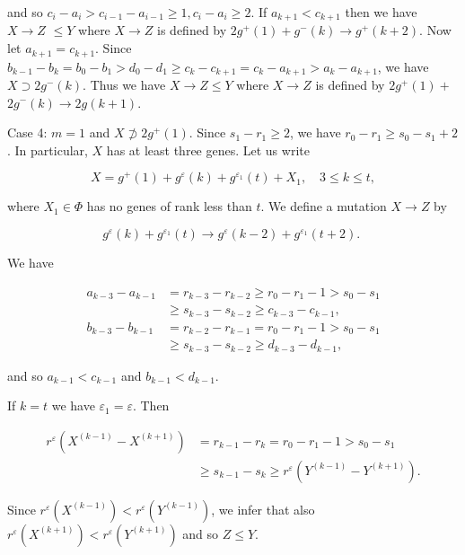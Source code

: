 \documentclass[10pt]{article}
\begin{document}
and so $c_{i}-a_{i}>c_{i-1}-a_{i-1} \geqslant 1, c_{i}-a_{i} \geqslant 2$. If $a_{k+1}<c_{k+1}$ then we have $X \rightarrow Z$ $\leqslant Y$ where $X \rightarrow Z$ is defined by $2 g^{+}(1)+g^{-}(k) \rightarrow g^{+}(k+2)$. Now let $a_{k+1}=c_{k+1}$. Since $b_{k-1}-b_{k}=b_{0}-b_{1}>d_{0}-d_{1} \geqslant c_{k}-c_{k+1}=c_{k}-a_{k+1}>a_{k}-a_{k+1}$, we have $X \supset 2 g^{-}(k)$. Thus we have $X \rightarrow Z \leqslant Y$ where $X \rightarrow Z$ is defined by $2 g^{+}(1)+$ $2 g^{-}(k) \rightarrow 2 g(k+1)$.

Case 4: $m=1$ and $X \not \supset 2 g^{+}(1)$. Since $s_{1}-r_{1} \geqslant 2$, we have $r_{0}-r_{1} \geqslant s_{0}-s_{1}+2$. In particular, $X$ has at least three genes. Let us write

$$
X=g^{+}(1)+g^{\varepsilon}(k)+g^{\varepsilon_{1}}(t)+X_{1}, \quad 3 \leqslant k \leqslant t,
$$

where $X_{1} \in \Phi$ has no genes of rank less than $t$. We define a mutation $X \rightarrow Z$ by

$$
g^{\varepsilon}(k)+g^{\varepsilon_{1}}(t) \rightarrow g^{\varepsilon}(k-2)+g^{\varepsilon_{1}}(t+2) \text {. }
$$

We have

$$
\begin{aligned}
a_{k-3}-a_{k-1} & =r_{k-3}-r_{k-2} \geqslant r_{0}-r_{1}-1>s_{0}-s_{1} \\
& \geqslant s_{k-3}-s_{k-2} \geqslant c_{k-3}-c_{k-1}, \\
b_{k-3}-b_{k-1} & =r_{k-2}-r_{k-1}=r_{0}-r_{1}-1>s_{0}-s_{1} \\
& \geqslant s_{k-3}-s_{k-2} \geqslant d_{k-3}-d_{k-1},
\end{aligned}
$$

and so $a_{k-1}<c_{k-1}$ and $b_{k-1}<d_{k-1}$.

If $k=t$ we have $\varepsilon_{1}=\varepsilon$. Then

$$
\begin{aligned}
r^{\varepsilon}\left(X^{(k-1)}-X^{(k+1)}\right) & =r_{k-1}-r_{k}=r_{0}-r_{1}-1>s_{0}-s_{1} \\
& \geqslant s_{k-1}-s_{k} \geqslant r^{\varepsilon}\left(Y^{(k-1)}-Y^{(k+1)}\right) .
\end{aligned}
$$

Since $r^{\varepsilon}\left(X^{(k-1)}\right)<r^{\varepsilon}\left(Y^{(k-1)}\right)$, we infer that also $r^{\varepsilon}\left(X^{(k+1)}\right)<r^{\varepsilon}\left(Y^{(k+1)}\right)$ and so $Z \leqslant Y$.
\end{document}
